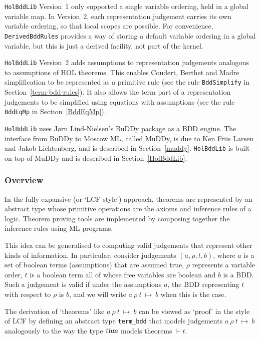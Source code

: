 \documentclass[12pt]{book}
\renewcommand{\t}[1]{\mbox{\tt #1}}
\newcommand{\termbdd}[4]{\mbox{$#1~#2~#3~\mapsto~#4$}}
\newcommand\termbddty{\texttt{term\_bdd}{}}
\newcommand{\Buddy}{BuDDy{}}
\newcommand{\Muddy}{MuDDy{}}
\begin{document}
{\tt{HolBddLib}} Version~1 only supported a single variable
ordering, held in a global variable map. In Version~2, each
representation judgement carries its own variable ordering, so that local
scopes are possible. For convenience, {\tt{DerivedBddRules}}
provides a way of storing a default variable ordering in a global
variable, but this is just a derived facility, not part of the kernel.

{\tt{HolBddLib}} Version~2 adds assumptions to representation judgements
analogous to assumptions of HOL theorems. This enables
Coudert, Berthet and Madre simplification to be represented as a primitive
rule (see the rule \t{BddSimplify} in Section~\ref{term-bdd-rules}). It also allows the term part
of a representation judgements to be simplified using equations with assumptions
(see the rule \t{BddEqMp} in Section~\ref{BddEqMp}).

{\tt HolBddLib} uses J{\o}rn Lind-Nielsen's \Buddy{} package as a BDD
engine. The interface from \Buddy{} to Moscow ML, called \Muddy, is
due to Ken Friis Larsen and Jakob Lichtenberg, and is described in Section~\ref{muddy}.
{\tt HolBddLib} is built on top of \Muddy{} and
is described in Section~\ref{HolBddLib}.

\subsubsection{Overview}

In the fully expansive (or `LCF style') approach, theorems are represented by an abstract type
whose primitive operations are the axioms and inference rules of a
logic.  Theorem proving tools are implemented by composing together
the inference rules using ML programs.

This idea can be generalised to computing valid judgements that
represent other kinds of information. In particular, consider
judgements $(a,\rho,t,b)$, where $a$ is a set of boolean terms
(assumptions) that are assumed true, $\rho$ represents a variable
order, $t$ is a boolean term all of whose free variables are boolean
and $b$ is a BDD. Such a judgement is valid if under the assumptions
$a$, the BDD representing $t$ with respect to $\rho$ is $b$, and we
will write \termbdd{a}{\rho}{t}{b} when this is the case.

The derivation of `theorems' like \termbdd{a}{\rho}{t}{b} can be viewed
as `proof' in the style of LCF by defining an abstract type \termbddty{}
that models
judgements $\termbdd{a}{\rho}{t}{b}$ analogously
to the way the type $\textsl{thm}$ models theorems $\vdash t$.
\end{document}
